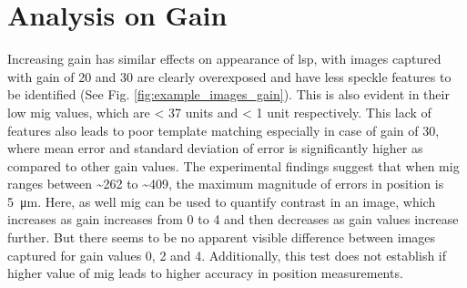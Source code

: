 


\section{Analysis on Gain}
    Increasing gain has similar effects on appearance of \gls{lsp}, with images captured with gain of 20 and 30 are clearly overexposed and have less speckle features to be identified (See Fig. \ref{fig:example_images_gain}). This is also evident in their low \gls{mig} values, which are < 37 units and < 1 unit respectively. This lack of features also leads to poor template matching especially in case of gain of 30, where mean error and standard deviation of error is significantly higher as compared to other gain values. The experimental findings suggest that when \gls{mig} ranges between \sim262 to \sim409, the maximum magnitude of errors in position is \SI{5}{\micro\meter}. Here, as well \gls{mig} can be used to quantify contrast in an image, which increases as gain increases from 0 to 4 and then decreases as gain values increase further. But there seems to be no apparent visible difference between images captured for gain values 0, 2 and 4. Additionally, this test does not establish if higher value of \gls{mig} leads to higher accuracy in position measurements.


